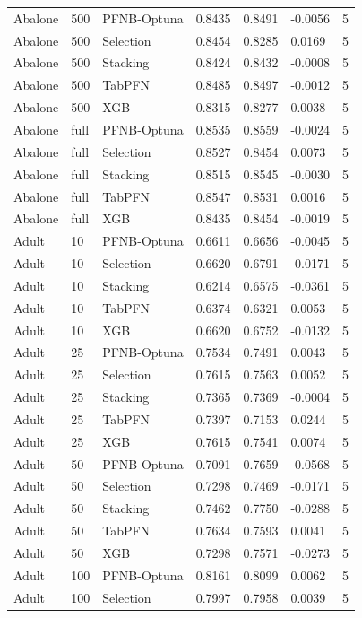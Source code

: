 \begin{tabular}{llllllr}
Abalone & 500 & PFNB-Optuna & 0.8435 & 0.8491 & -0.0056 & 5 \\
Abalone & 500 & Selection & 0.8454 & 0.8285 & 0.0169 & 5 \\
Abalone & 500 & Stacking & 0.8424 & 0.8432 & -0.0008 & 5 \\
Abalone & 500 & TabPFN & 0.8485 & 0.8497 & -0.0012 & 5 \\
Abalone & 500 & XGB & 0.8315 & 0.8277 & 0.0038 & 5 \\
Abalone & full & PFNB-Optuna & 0.8535 & 0.8559 & -0.0024 & 5 \\
Abalone & full & Selection & 0.8527 & 0.8454 & 0.0073 & 5 \\
Abalone & full & Stacking & 0.8515 & 0.8545 & -0.0030 & 5 \\
Abalone & full & TabPFN & 0.8547 & 0.8531 & 0.0016 & 5 \\
Abalone & full & XGB & 0.8435 & 0.8454 & -0.0019 & 5 \\
Adult & 10 & PFNB-Optuna & 0.6611 & 0.6656 & -0.0045 & 5 \\
Adult & 10 & Selection & 0.6620 & 0.6791 & -0.0171 & 5 \\
Adult & 10 & Stacking & 0.6214 & 0.6575 & -0.0361 & 5 \\
Adult & 10 & TabPFN & 0.6374 & 0.6321 & 0.0053 & 5 \\
Adult & 10 & XGB & 0.6620 & 0.6752 & -0.0132 & 5 \\
Adult & 25 & PFNB-Optuna & 0.7534 & 0.7491 & 0.0043 & 5 \\
Adult & 25 & Selection & 0.7615 & 0.7563 & 0.0052 & 5 \\
Adult & 25 & Stacking & 0.7365 & 0.7369 & -0.0004 & 5 \\
Adult & 25 & TabPFN & 0.7397 & 0.7153 & 0.0244 & 5 \\
Adult & 25 & XGB & 0.7615 & 0.7541 & 0.0074 & 5 \\
Adult & 50 & PFNB-Optuna & 0.7091 & 0.7659 & -0.0568 & 5 \\
Adult & 50 & Selection & 0.7298 & 0.7469 & -0.0171 & 5 \\
Adult & 50 & Stacking & 0.7462 & 0.7750 & -0.0288 & 5 \\
Adult & 50 & TabPFN & 0.7634 & 0.7593 & 0.0041 & 5 \\
Adult & 50 & XGB & 0.7298 & 0.7571 & -0.0273 & 5 \\
Adult & 100 & PFNB-Optuna & 0.8161 & 0.8099 & 0.0062 & 5 \\
Adult & 100 & Selection & 0.7997 & 0.7958 & 0.0039 & 5 \\

\end{tabular}
